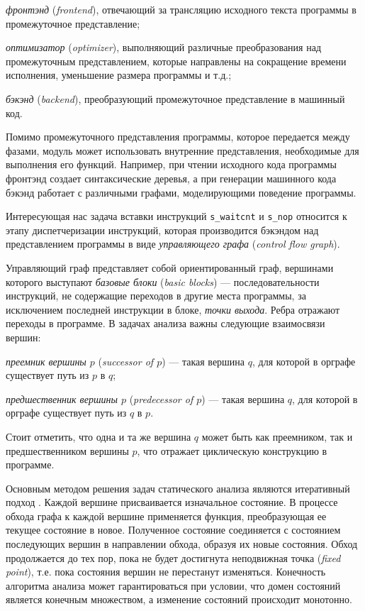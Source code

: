 \documentclass[a4paper,14pt]{extarticle}
\begin{document}
{\begin{ul}
\item \textit{фронтэнд} (\textit{frontend}), отвечающий за трансляцию исходного текста программы в
  промежуточное представление;
\item \textit{оптимизатор} (\textit{optimizer}), выполняющий различные преобразования над промежуточным
  представлением, которые направлены на сокращение времени исполнения,
  уменьшение размера программы и т.д.;
\item \textit{бэкэнд} (\textit{backend}), преобразующий промежуточное представление в машинный код.
\end{ul}

Помимо промежуточного представления программы, которое передается между фазами,
модуль может использовать внутренние представления, необходимые для выполнения его функций.
Например, при чтении исходного кода программы фронтэнд создает синтаксические деревья,
а при генерации машинного кода бэкэнд работает с различными графами, моделирующими поведение
программы.

Интересующая нас задача вставки инструкций \verb|s_waitcnt| и \verb|s_nop| относится
к этапу диспетчеризации инструкций, которая производится бэкэндом над представлением программы
в виде \textit{управляющего графа} (\textit{control flow graph}).

Управляющий граф \cite{cfg-allen, cfg-ru} представляет собой ориентированный граф, вершинами которого
выступают \textit{базовые блоки} (\textit{basic blocks}) — последовательности инструкций,
не содержащие переходов в другие места программы, за исключением последней
инструкции в блоке, \textit{точки выхода}. Ребра отражают переходы в программе.
В задачах анализа важны следующие взаимосвязи вершин:
\begin{ul}
\item \textit{преемник вершины $p$} (\textit{successor of $p$}) — такая вершина $q$,
  для которой в орграфе существует путь из $p$ в $q$;
\item \textit{предшественник вершины $p$} (\textit{predecessor of $p$}) — такая вершина $q$,
  для которой в орграфе существует путь из $q$ в $p$.
\end{ul}
Стоит отметить, что одна и та же вершина $q$ может быть как преемником, так и предшественником вершины $p$,
что отражает циклическую конструкцию в программе.

Основным методом решения задач статического анализа являются итеративный подход \cite[глава~8]{compilers}.
Каждой вершине присваивается изначальное состояние. В процессе обхода графа к каждой вершине
применяется функция, преобразующая ее текущее состояние в новое. Полученное состояние
соединяется с состоянием последующих вершин в направлении обхода, образуя их новые состояния.
Обход продолжается до тех пор, пока не будет достигнута неподвижная точка (\textit{fixed point}), т.е.
пока состояния вершин не перестанут изменяться. Конечность алгоритма анализа может гарантироваться
при условии, что домен состояний является конечным множеством, а изменение состояний происходит монотонно.

}
\end{document}
